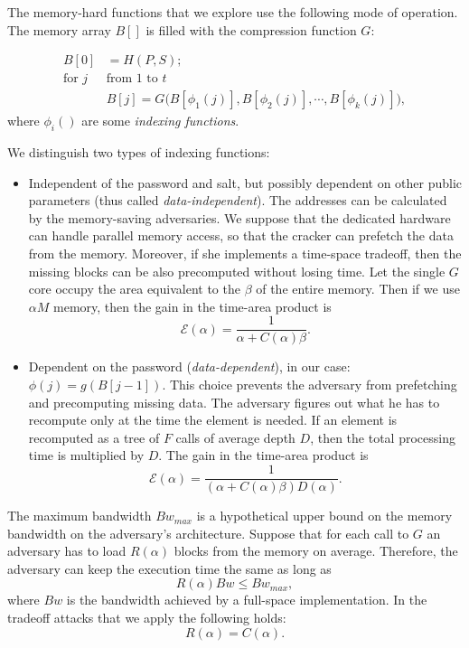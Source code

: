\documentclass[a4paper]{article}
\begin{document}
 The memory-hard functions that we explore use the following mode of operation. The memory array $B[]$ is filled with the   compression function $G$:

 \begin{equation}\label{eq:class}
\begin{array}{rl}
B[0] &= H(P,S);\\
\text{for $j$ }&\text{from 1  to } t\\
  &B[j] = G \bigl(B[\phi_1(j)] ,  B[\phi_2(j)] ,\cdots , B[\phi_k(j)]\bigr),
\end{array}
\end{equation}
where $\phi_i()$ are some \emph{indexing functions}.


We distinguish two types of indexing functions:
\begin{itemize}
  \item Independent of the password and salt, but possibly dependent on other public parameters (thus called \emph{data-independent}). The addresses can be calculated by the memory-saving adversaries. We suppose that the dedicated hardware can handle parallel memory access, so that the  cracker can prefetch the data from the memory. Moreover, if she implements a time-space tradeoff, then the missing blocks can be also precomputed without losing time. Let the single $G$ core occupy the area equivalent to the $\beta$ of the entire memory. Then if we use $\alpha M$ memory, then the  gain in the time-area product is
  $$
  \mathcal{E}(\alpha) = \frac{1}{\alpha + C(\alpha)\beta}.
  $$
  \item Dependent on the password (\emph{data-dependent}), in our case: $\phi(j) = g(B[j-1])$. This choice prevents the adversary from prefetching and precomputing missing data. The adversary figures out what he has to recompute only at the time the element is needed. If an element is recomputed as a tree of $F$ calls of average depth $D$, then the total processing time is multiplied by $D$. The   gain in the time-area product is
  $$
  \mathcal{E}(\alpha) = \frac{1}{(\alpha + C(\alpha)\beta)D(\alpha)}.
  $$
\end{itemize}


 The maximum bandwidth $Bw_{max}$ is a hypothetical upper bound on the memory bandwidth on the adversary's architecture. Suppose that for each call to $G$ an adversary has to load
  $R(\alpha)$ blocks from the memory on average. Therefore,  the adversary can keep the execution time the same as long as
 $$
 R(\alpha) Bw \leq Bw_{max},
 $$
 where $Bw$ is the bandwidth achieved by a full-space implementation. In the tradeoff attacks that we apply the following holds:
   $$
   R(\alpha)  = C(\alpha).
   $$
\end{document}
